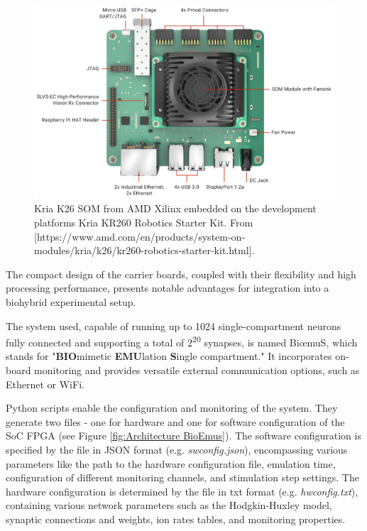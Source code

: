 \begin{figure}[ht!]
    \begin{center}
    \includegraphics[width=0.9\linewidth]{Figure/SoC FPGA.jpg}
    \end{center}
    \caption{Kria K26 SOM from AMD Xilinx embedded on the development platforms Kria KR260 Robotics Starter Kit. From [https://www.amd.com/en/products/system-on-modules/kria/k26/kr260-robotics-starter-kit.html].}
    \label{fig:SoC FPGA}
\end{figure}

The compact design of the carrier boards, coupled with their flexibility and high processing performance, presents notable advantages for integration into a biohybrid experimental setup.

The system used, capable of running up to 1024 single-compartment neurons fully connected and supporting a total of 2\textsuperscript{20} synapses, is named Bi{\oe}muS, which stands for "\textbf{BIO}mimetic \textbf{EMU}lation \textbf{S}ingle compartment." It incorporates on-board monitoring and provides versatile external communication options, such as Ethernet or WiFi. 

Python scripts enable the configuration and monitoring of the system. They generate two files - one for hardware and one for software configuration of the SoC FPGA (see Figure \ref{fig:Architecture BioEmus}). The software configuration is specified by the file in JSON format (e.g. \textit{swconfig.json}), encompassing various parameters like the path to the hardware configuration file, emulation time, configuration of different monitoring channels, and stimulation step settings. The hardware configuration is determined by the file in txt format (e.g. \textit{hwconfig.txt}), containing various network parameters such as the Hodgkin-Huxley model, synaptic connections and weights, ion rates tables, and monitoring properties.

